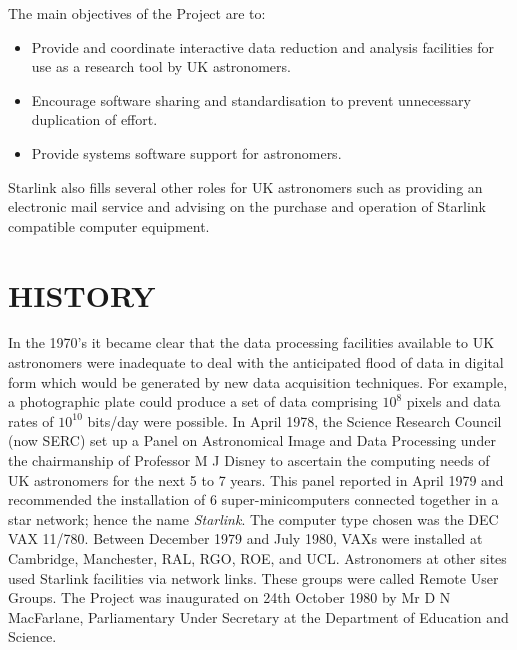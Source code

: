 The main objectives of the Project are to:
\begin{itemize}
\item Provide and coordinate interactive data reduction and analysis facilities
for use as a research tool by UK astronomers.
\item Encourage software sharing and standardisation to prevent unnecessary
duplication of effort.
\item Provide systems software support for astronomers.
\end{itemize}
Starlink also fills several other roles for UK astronomers such as providing
an electronic mail service and advising on the purchase and operation of
Starlink compatible computer equipment.

\section {HISTORY}

In the 1970's it became clear that the data processing facilities available to
UK astronomers were inadequate to deal with the anticipated flood of data in
digital form which would be generated by new data acquisition techniques.
For example, a photographic plate could produce a set of data comprising
$10^{8}$ pixels and data rates of $10^{10}$ bits/day were possible.
In April 1978, the Science Research Council (now SERC) set up a Panel on
Astronomical Image and Data Processing under the chairmanship of Professor M J
Disney to ascertain the computing needs of UK astronomers for the next 5 to 7
years.
This panel reported in April 1979 and recommended the installation of 6
super-minicomputers connected together in a star network; hence the name
{\em Starlink}.
The computer type chosen was the DEC VAX 11/780.
Between December 1979 and July 1980, VAXs were installed at Cambridge,
Manchester, RAL, RGO, ROE, and UCL.
Astronomers at other sites used Starlink facilities via network links.
These groups were called Remote User Groups.
The Project was inaugurated on 24th October 1980 by Mr D N MacFarlane,
Parliamentary Under Secretary at the Department of Education and Science.

